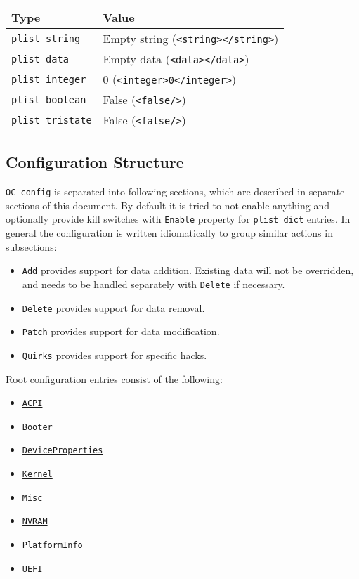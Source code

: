 \documentclass[]{article}
\providecommand{\tightlist}{%
  \setlength{\itemsep}{0pt}\setlength{\parskip}{0pt}}
\begin{document}
\begin{longtable}[]{@{}ll@{}}
\toprule
Type & Value\tabularnewline
\midrule
\endhead
\texttt{plist\ string} & Empty string
(\texttt{\textless{}string\textgreater{}\textless{}/string\textgreater{}})\tabularnewline
\texttt{plist\ data} & Empty data
(\texttt{\textless{}data\textgreater{}\textless{}/data\textgreater{}})\tabularnewline
\texttt{plist\ integer} & 0
(\texttt{\textless{}integer\textgreater{}0\textless{}/integer\textgreater{}})\tabularnewline
\texttt{plist\ boolean} & False
(\texttt{\textless{}false/\textgreater{}})\tabularnewline
\texttt{plist\ tristate} & False
(\texttt{\textless{}false/\textgreater{}})\tabularnewline
\bottomrule
\end{longtable}

\subsection{Configuration Structure}\label{configuration-structure}

\texttt{OC\ config} is separated into following sections, which are described
in separate sections of this document. By default it is tried to not enable
anything and optionally provide kill switches with \texttt{Enable} property
for \texttt{plist dict} entries. In general the configuration is written
idiomatically to group similar actions in subsections:

\begin{itemize}
\tightlist
\item
  \texttt{Add} provides support for data addition. Existing data will
  not be overridden, and needs to be handled separately with
  \texttt{Delete} if necessary.
\item
  \texttt{Delete} provides support for data removal.
\item
  \texttt{Patch} provides support for data modification.
\item
  \texttt{Quirks} provides support for specific hacks.
\end{itemize}

Root configuration entries consist of the following:

\begin{itemize}
\tightlist
\item
  \hyperref[acpi]{\texttt{ACPI}}
\item
  \hyperref[booter]{\texttt{Booter}}
\item
  \hyperref[devprops]{\texttt{DeviceProperties}}
\item
  \hyperref[kernel]{\texttt{Kernel}}
\item
  \hyperref[misc]{\texttt{Misc}}
\item
  \hyperref[nvram]{\texttt{NVRAM}}
\item
  \hyperref[platforminfo]{\texttt{PlatformInfo}}
\item
  \hyperref[uefi]{\texttt{UEFI}}
\end{itemize}
\end{document}
